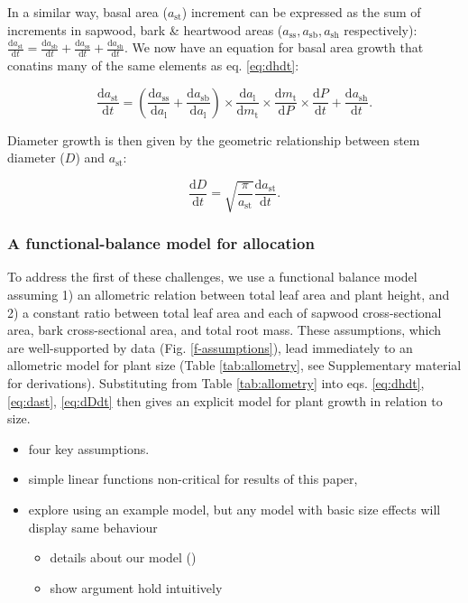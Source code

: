 \documentclass[12pt, a4paper]{article}
\begin{document}
In a similar way, basal area ($a_\textrm{st}$) increment can be
expressed as the sum of increments in sapwood, bark \& heartwood areas
($a_\textrm{ss}, a_\textrm{sb}, a_\textrm{sh}$ respectively):
$\frac{\textrm{d}a_\textrm{st}}{\textrm{d}t}= \frac{\textrm{d}a_\textrm{sb}}{\textrm{d}t} + \frac{\textrm{d}a_\textrm{ss}}{\textrm{d}t} + \frac{\textrm{d}a_\textrm{sh}}{\textrm{d}t}$.
We now have an equation for basal area growth that conatins many of the same
elements as eq. \ref{eq:dhdt}:

\begin{equation}\label{eq:dast}
\frac{\textrm{d}a_\textrm{st}}{\textrm{d}t}=
\left(\frac{\textrm{d}a_\textrm{ss}}{\textrm{d}a_\textrm{l}} + \frac{\textrm{d}a_\textrm{sb}}{\textrm{d}a_\textrm{l}}\right) \times
\frac{\textrm{d}a_\textrm{l}}{\textrm{d}m_\textrm{t}} \times \frac{\textrm{d}m_\textrm{t}}{\textrm{d}P} \times \frac{\textrm{d}P}{\textrm{d}t} +\frac{\textrm{d}a_\textrm{sh}}{\textrm{d}t} .
\end{equation}

Diameter growth is then given by the geometric relationship between stem
diameter ($D$) and $a_\textrm{st}$:

\begin{equation} \label{eq:dDdt}
\frac{\textrm{d}D}{\textrm{d}t}= \sqrt{\frac{\pi}{a_\textrm{st}}} \frac{\textrm{d}a_\textrm{st}}{\textrm{d}t}.
\end{equation}

\subsubsection{A functional-balance model for allocation}

To address the first of these challenges, we use a functional balance
model \citep{yokozawa-1995,falster-2011} assuming
1) an allometric relation between total leaf area and plant height, and
2) a constant ratio between total leaf area and each of sapwood
cross-sectional area, bark cross-sectional area, and total root mass.
These assumptions, which are well-supported by data (Fig.
\ref{f-assumptions}), lead immediately to an allometric model for plant
size (Table \ref{tab:allometry}, see Supplementary material for
derivations). Substituting from Table \ref{tab:allometry} into eqs.
\ref{eq:dhdt}, \ref{eq:dast}, \ref{eq:dDdt} then gives an explicit model
for plant growth in relation to size.


\begin{itemize}
\itemsep1pt\parskip0pt
\item
  four key assumptions.
\item
  simple linear functions non-critical for results of this paper,
\item
  explore using an example model, but any model with basic size effects
  will display same behaviour

  \begin{itemize}
  \itemsep1pt\parskip0pt
  \item
    details about our model ()
  \item
    show argument hold intuitively
  \end{itemize}
\end{itemize}
\end{document}
